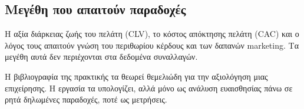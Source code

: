\subsection{Μεγέθη που απαιτούν παραδοχές}

Η αξία διάρκειας ζωής του πελάτη (\textenglish{CLV}), το κόστος απόκτησης
πελάτη (\textenglish{CAC}) και ο λόγος τους απαιτούν γνώση του περιθωρίου
κέρδους και των δαπανών marketing. Τα μεγέθη αυτά δεν περιέχονται στα δεδομένα
συναλλαγών.

Η βιβλιογραφία της πρακτικής \cite{croll2013lean} τα θεωρεί θεμελιώδη για
την αξιολόγηση μιας επιχείρησης. Η εργασία τα υπολογίζει, αλλά μόνο ως ανάλυση
ευαισθησίας πάνω σε ρητά δηλωμένες παραδοχές, ποτέ ως μετρήσεις.
